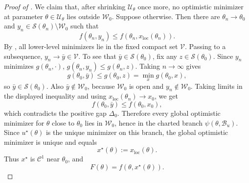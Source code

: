 \documentclass{article}
\theoremstyle{normaltheorem}
\newcommand{\calS}{\mathcal{S}}
\begin{document}
\begin{proof}[Proof of ]
We claim that, after shrinking \(\mathcal U_\theta\) once more, no optimistic minimizer at parameter
\(\theta\in\mathcal U_\theta\) lies outside \(\mathcal W_0\). Suppose otherwise. Then there are \(\theta_n\to\theta_0\)
and \(y_n\in\calS(\theta_n)\setminus\mathcal W_0\) such that
\[
f(\theta_n,y_n)\le f(\theta_n,x_{\mathrm{loc}}(\theta_n)).
\]
By , all lower-level minimizers lie in the fixed compact set \(\mathcal V\). Passing to a subsequence,
\(y_n\to\bar y\in\mathcal V\). To see that \(\bar y\in\calS(\theta_0)\), fix any \(z\in\calS(\theta_0)\). Since
\(y_n\) minimizes \(g(\theta_n,\cdot)\), \(g(\theta_n,y_n)\le g(\theta_n,z)\). Taking \(n\to\infty\) gives
\[
g(\theta_0,\bar y)\le g(\theta_0,z)=\min_x g(\theta_0,x),
\]
so \(\bar y\in\calS(\theta_0)\). Also \(\bar y\notin\mathcal W_0\), because \(\mathcal W_0\) is open and
\(y_n\notin\mathcal W_0\). Taking limits in the displayed inequality and using
\(x_{\mathrm{loc}}(\theta_n)\to x_0\), we get
\[
f(\theta_0,\bar y)\le f(\theta_0,x_0),
\]
which contradicts the positive gap \(\Delta_0\). Therefore every global optimistic minimizer for \(\theta\) close to
\(\theta_0\) lies in \(\mathcal W_0\), hence in the charted branch \(\psi(\theta,\mathcal B_u)\). Since
\(u^\star(\theta)\) is the unique minimizer on this branch, the global optimistic minimizer is unique and equals
\[
x^\star(\theta):=x_{\mathrm{loc}}(\theta).
\]
Thus \(x^\star\) is \(\mathcal C^1\) near \(\theta_0\), and
\[
F(\theta)=f(\theta,x^\star(\theta)).
\]


\end{proof}
\end{document}
